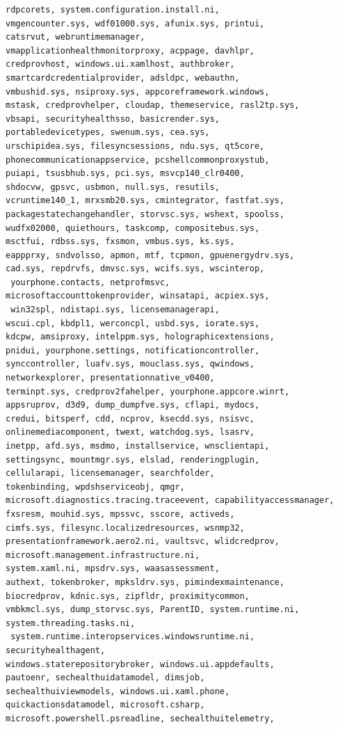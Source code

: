 \documentclass[a4paper,twoside,12pt]{book}
\begin{document}
\begin{appendices}
\begin{lstlisting}[label={lst:dlls},caption={All gathered DLL's},escapeinside=``,basicstyle=\tiny,breaklines=true]
rdpcorets, system.configuration.install.ni, 
vmgencounter.sys, wdf01000.sys, afunix.sys, printui, 
catsrvut, webruntimemanager, 
vmapplicationhealthmonitorproxy, acppage, davhlpr, 
credprovhost, windows.ui.xamlhost, authbroker, 
smartcardcredentialprovider, adsldpc, webauthn, 
vmbushid.sys, nsiproxy.sys, appcoreframework.windows, 
mstask, credprovhelper, cloudap, themeservice, rasl2tp.sys, 
vbsapi, securityhealthsso, basicrender.sys, 
portabledevicetypes, swenum.sys, cea.sys, 
urschipidea.sys, filesyncsessions, ndu.sys, qt5core, 
phonecommunicationappservice, pcshellcommonproxystub, 
puiapi, tsusbhub.sys, pci.sys, msvcp140_clr0400, 
shdocvw, gpsvc, usbmon, null.sys, resutils, 
vcruntime140_1, mrxsmb20.sys, cmintegrator, fastfat.sys, 
packagestatechangehandler, storvsc.sys, wshext, spoolss, 
wudfx02000, quiethours, taskcomp, compositebus.sys, 
msctfui, rdbss.sys, fxsmon, vmbus.sys, ks.sys, 
eappprxy, sndvolsso, apmon, mtf, tcpmon, gpuenergydrv.sys, 
cad.sys, repdrvfs, dmvsc.sys, wcifs.sys, wscinterop,
 yourphone.contacts, netprofmsvc, 
microsoftaccounttokenprovider, winsatapi, acpiex.sys,
 win32spl, ndistapi.sys, licensemanagerapi, 
wscui.cpl, kbdpl1, werconcpl, usbd.sys, iorate.sys, 
kdcpw, amsiproxy, intelppm.sys, holographicextensions, 
pnidui, yourphone.settings, notificationcontroller, 
synccontroller, luafv.sys, mouclass.sys, qwindows, 
networkexplorer, presentationnative_v0400, 
terminpt.sys, credprov2fahelper, yourphone.appcore.winrt, 
appsruprov, d3d9, dump_dumpfve.sys, cflapi, mydocs, 
credui, bitsperf, cdd, ncprov, ksecdd.sys, nsisvc, 
onlinemediacomponent, twext, watchdog.sys, lsasrv, 
inetpp, afd.sys, msdmo, installservice, wnsclientapi, 
settingsync, mountmgr.sys, elslad, renderingplugin, 
cellularapi, licensemanager, searchfolder, 
tokenbinding, wpdshserviceobj, qmgr, 
microsoft.diagnostics.tracing.traceevent, capabilityaccessmanager, 
fxsresm, mouhid.sys, mpssvc, sscore, activeds, 
cimfs.sys, filesync.localizedresources, wsnmp32, 
presentationframework.aero2.ni, vaultsvc, wlidcredprov, 
microsoft.management.infrastructure.ni, 
system.xaml.ni, mpsdrv.sys, waasassessment, 
authext, tokenbroker, mpksldrv.sys, pimindexmaintenance, 
biocredprov, kdnic.sys, zipfldr, proximitycommon, 
vmbkmcl.sys, dump_storvsc.sys, ParentID, system.runtime.ni, 
system.threading.tasks.ni,
 system.runtime.interopservices.windowsruntime.ni, securityhealthagent, 
windows.staterepositorybroker, windows.ui.appdefaults, 
pautoenr, sechealthuidatamodel, dimsjob, 
sechealthuiviewmodels, windows.ui.xaml.phone, 
quickactionsdatamodel, microsoft.csharp, 
microsoft.powershell.psreadline, sechealthuitelemetry, 

\end{lstlisting}
\end{appendices}
\end{document}

